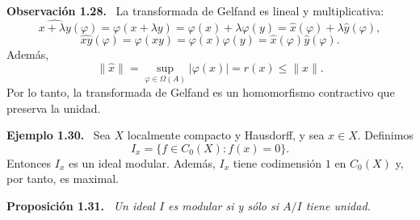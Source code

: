 \documentclass[11pt]{article}
\newenvironment{proposicion}[1]
  {\par\medskip\noindent\textbf{Proposición #1.}\ \itshape}
  {\par\medskip}
\newenvironment{observacion}[1]
  {\par\medskip\noindent\textbf{Observación #1.}\ }
  {\par\medskip}
\newenvironment{ejemplo}[1]
  {\par\medskip\noindent\textbf{Ejemplo #1.}\ }
  {\par\medskip}
\begin{document}
\begin{observacion}{1.28}
La transformada de Gelfand es lineal y multiplicativa:
\[
  \widehat{x+\lambda y}(\varphi)
  =\varphi(x+\lambda y)
  =\varphi(x)+\lambda\varphi(y)
  =\widehat{x}(\varphi)+\lambda\widehat{y}(\varphi),
\]
\[
  \widehat{xy}(\varphi)
  =\varphi(xy)
  =\varphi(x)\varphi(y)
  =\widehat{x}(\varphi)\widehat{y}(\varphi).
\]
Además,
\[
  \lVert\widehat{x}\rVert
  =\sup_{\varphi\in\Omega(A)}|\varphi(x)|
  =r(x)
  \leq\lVert x\rVert.
\]
Por lo tanto, la transformada de Gelfand es un homomorfismo contractivo que preserva la unidad.
\end{observacion}

\begin{ejemplo}{1.30}
Sea $X$ localmente compacto y Hausdorff, y sea $x\in X$. Definimos
\[
  I_x=\{f\in C_0(X):f(x)=0\}.
\]
Entonces $I_x$ es un ideal modular. Además, $I_x$ tiene codimensión $1$ en $C_0(X)$ y, por tanto, es maximal.
\end{ejemplo}

\begin{proposicion}{1.31}
Un ideal $I$ es modular si y sólo si $A/I$ tiene unidad.
\end{proposicion}
\end{document}
